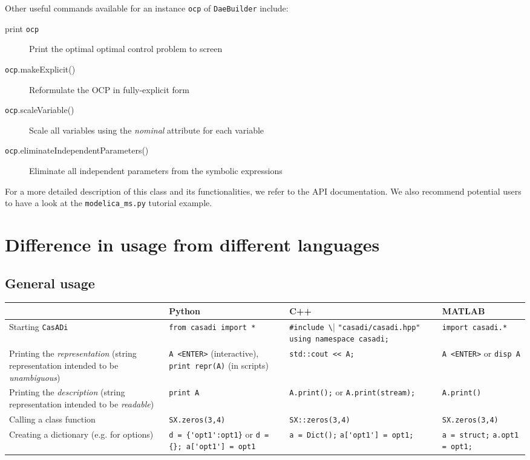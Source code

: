 \documentclass[a4paper,12pt]{book}
\newcommand{\CasADi}{\texttt{CasADi}\xspace}
\begin{document}
Other useful commands available for an instance \texttt{ocp} of \texttt{DaeBuilder} include:
\begin{description}
\item[print \texttt{ocp}] Print the optimal optimal control problem to screen
\item[\texttt{ocp}.makeExplicit()] Reformulate the OCP in fully-explicit form
\item[\texttt{ocp}.scaleVariable()] Scale all variables using the \emph{nominal} attribute for each variable
\item[\texttt{ocp}.eliminateIndependentParameters()] Eliminate all independent parameters from the symbolic expressions
\end{description}

For a more detailed description of this class and its functionalities, we refer to the API documentation. We also recommend potential users to have a look at the {\texttt{modelica\_ms.py}} tutorial example.

\chapter{Difference in usage from different languages} \label{ch:syntax_differences}

\section{General usage}
\begin{center}
  \scriptsize
  \begin{tabular}{| p{3.5cm} | p{3.5cm} | p{3.5cm} | p{3.5cm} | }
    \hline
      & Python & C++ & MATLAB \\ \hline
    Starting \CasADi & \verb|from casadi import *| & \verb|#include \| \verb|"casadi/casadi.hpp"| \verb|using namespace casadi;| & \verb|import casadi.*| \\ \hline
    Printing the \emph{representation} (string representation intended to be \emph{unambiguous}) & \verb|A <ENTER>| (interactive), \verb|print repr(A)| (in scripts) & \verb|std::cout << A;|& \verb|A <ENTER>| or \verb|disp A|\\ \hline
    Printing the \emph{description} (string representation intended to be \emph{readable}) & \verb|print A| & \verb|A.print();| or \verb|A.print(stream);|& \verb|A.print()| \\ \hline
    Calling a class function & \verb|SX.zeros(3,4)| & \verb|SX::zeros(3,4)| & \verb|SX.zeros(3,4)|\\ \hline
    Creating a dictionary (e.g. for options) & \verb|d = {'opt1':opt1}| or \verb|d = {}; a['opt1'] = opt1| & \verb|a = Dict();| \verb|a['opt1'] = opt1;| & \verb|a = struct;| \verb|a.opt1 = opt1;| \\ \hline
  \end{tabular}
\end{center}
\end{document}
